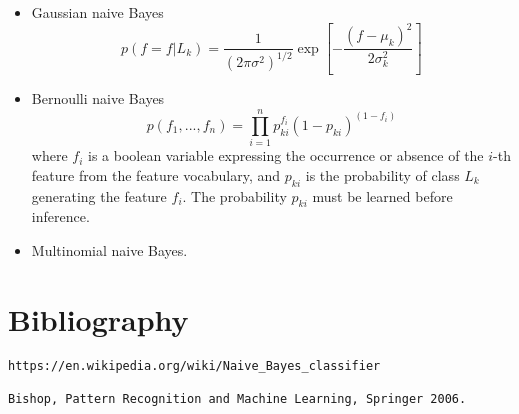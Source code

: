 \documentclass{article}
\begin{document}
\begin{itemize}
    \item Gaussian naive Bayes
        \begin{equation}
            p(f = f | L_k) = \frac{1}{(2\pi\sigma^2)^{1/2}} \exp\left[ -\frac{ (f-\mu_k)^2}{2\sigma_k^2}\right]
        \end{equation}
        
    \item Bernoulli naive Bayes
        \begin{equation}
            p(f_1,...,f_n) = \prod_{i=1}^n p^{f_i}_{ki} (1-p_{ki})^{(1-f_i)}
        \end{equation}
        where $f_i$ is a boolean variable expressing the occurrence or absence of the $i$-th feature from the feature vocabulary, and $p_{ki}$ is the probability of class $L_k$ generating the feature $f_i$. The probability $p_{ki}$ must be learned before inference.
    \item Multinomial naive Bayes. 
\end{itemize}

\section*{Bibliography}
\begin{verbatim}
https://en.wikipedia.org/wiki/Naive_Bayes_classifier

Bishop, Pattern Recognition and Machine Learning, Springer 2006.
\end{verbatim}
\end{document}
